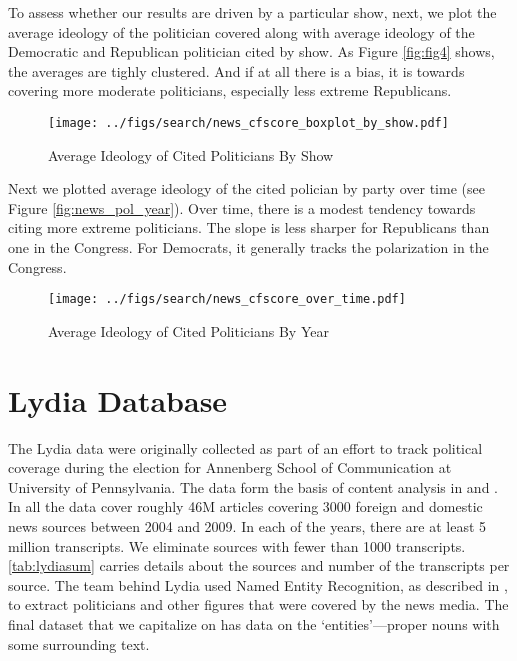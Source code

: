 \documentclass[12pt, letterpaper]{article}
\begin{document}
To assess whether our results are driven by a particular show, next, we plot the average ideology of the politician covered along with average ideology of the Democratic and Republican politician cited by show. As Figure \ref{fig:fig4} shows, the averages are tighly clustered. And if at all there is a bias, it is towards covering more moderate politicians, especially less extreme Republicans.

\begin{figure}[h]
  \centering
  \caption{Average Ideology of Cited Politicians By Show}
  \texttt{[image: ../figs/search/news\_cfscore\_boxplot\_by\_show.pdf]}
  \label{fig:cfscore_box_show_newsbank}
\end{figure}

Next we plotted average ideology of the cited polician by party over time (see Figure \ref{fig:news_pol_year}). Over time, there is a modest tendency towards citing more extreme politicians. The slope is less sharper for Republicans than one in the Congress. For Democrats, it generally tracks the polarization in the Congress.

\begin{figure}[h]
  \centering
  \caption{Average Ideology of Cited Politicians By Year}
  \texttt{[image: ../figs/search/news\_cfscore\_over\_time.pdf]}
  \label{fig:year_newsbank}
\end{figure}
\clearpage

\section{Lydia Database}
\label{si_lydia_sum}
The Lydia data were originally collected as part of an effort to track political coverage during the election for Annenberg School of Communication at University of Pennsylvania. The data form the basis of content analysis in \citet{kenski2010obama} and \citet{van2013only}.  In all the data cover roughly 46M articles covering 3000 foreign and domestic news sources between 2004 and 2009. In each of the years, there are at least 5 million transcripts. We eliminate sources with fewer than 1000 transcripts. \ref{tab:lydiasum} carries details about the sources and number of the transcripts per source. The team behind Lydia used Named Entity Recognition, as described in \citet{bautin2009news}, to extract   politicians and other figures that were covered by the news media. The final dataset that we capitalize on has data on the `entities'---proper nouns with some surrounding text.
\end{document}
